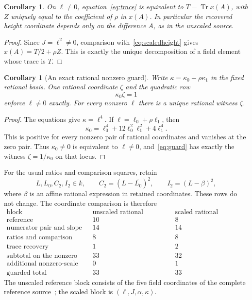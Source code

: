 \documentclass[11pt,a4paper]{article}
\newtheorem{corollary}[theorem]{Corollary}
\theoremstyle{remark}\newtheorem{remark}[theorem]{Remark}
\DeclareMathOperator{\Tr}{Tr}
\begin{document}
\begin{corollary}\label{cor:trace}
On $\ell\ne0$, equation~\eqref{eq:trace} is equivalent to
$T=\Tr x(A)$, with $Z$ uniquely equal to the coefficient of $\rho$
in $x(A)$. In particular the recovered height coordinate depends
only on the difference $A$, as in the unscaled source.
\end{corollary}
\begin{proof}
Since $J=\ell^2\ne0$, comparison with~\eqref{eq:scaledheight}
gives $x(A)=T/2+\rho Z$. This is exactly the unique decomposition
of a field element whose trace is $T$.
\end{proof}

\begin{corollary}[An exact rational nonzero guard]\label{cor:guard}
Write $\kappa=\kappa_0+\rho\kappa_1$ in the fixed rational basis.
One rational coordinate $\zeta$ and the quadratic row
\begin{equation}\label{eq:guard}
                            \kappa_0\zeta=1
\end{equation}
enforce $\ell\ne0$ exactly. For every nonzero $\ell$ there is a
unique rational witness $\zeta$.
\end{corollary}
\begin{proof}
The equations give $\kappa=\ell^4$. If
$\ell=\ell_0+\rho\ell_1$, then
\[
 \kappa_0=\ell_0^4+12\ell_0^2\ell_1^2+4\ell_1^4.
\]
This is positive for every nonzero pair of rational coordinates
and vanishes at the zero pair. Thus $\kappa_0\ne0$ is equivalent
to $\ell\ne0$, and~\eqref{eq:guard} has exactly the witness
$\zeta=1/\kappa_0$ on that locus.
\end{proof}

For the usual ratios and comparison squares, retain
\[
 L,L_0,C_2,I_2\in k,\qquad
 C_2=(L-\overline{L_0})^2,\qquad I_2=(L-\beta)^2,
\]
where $\beta$ is an affine rational expression in retained coordinates.
These rows do not change. The coordinate comparison is therefore
\[
\begin{array}{l|r|r}
 \text{block}&\text{unscaled rational coordinates}&
                   \text{scaled rational coordinates}\\\hline
 \text{reference}&10&8\\
 \text{numerator pair and slope}&14&14\\
 \text{ratios and comparison squares}&8&8\\
 \text{trace recovery}&1&2\\\hline
 \text{subtotal on the nonzero locus}&33&32\\
 \text{additional nonzero-scale guard}&0&1\\\hline
 \text{guarded total}&33&33
\end{array}
\]
The unscaled reference block consists of the five field coordinates
of the complete reference source~\cite{Reference}; the scaled block
is $(\ell,J,\alpha,\kappa)$.
\end{document}
